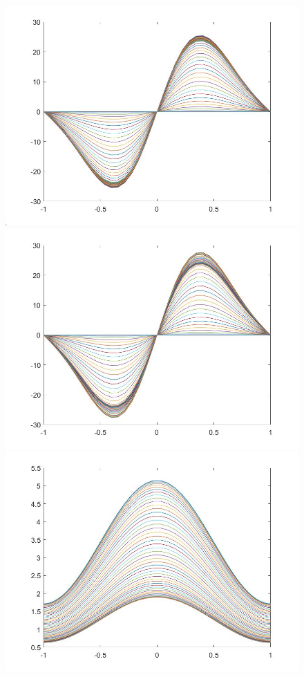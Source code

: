 \documentclass[11pt, a4paper]{article}
\theoremstyle{definition}
\begin{document}
\begin{figure}[h]
	\includegraphics[scale=0.3]{Nexpw1a.jpg}
	\includegraphics[scale=0.3]{Nexpw2a.jpg}
	\includegraphics[scale=0.3]{Nexprho1a.jpg}

\end{figure}
\end{document}
